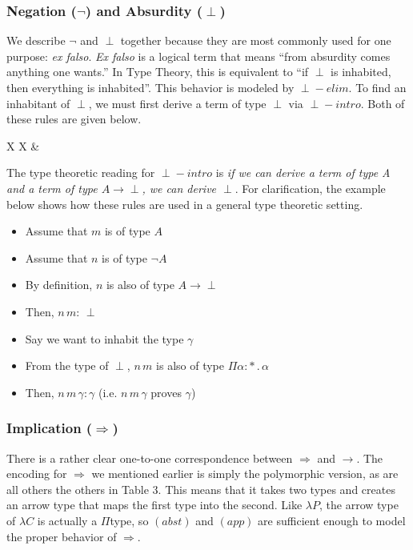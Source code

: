 \documentclass[9pt,preprint,nocopyrightspace,computermodern]{sigplanconf} %
\begin{document}
\subsubsection* {Negation (\(\neg\)) and Absurdity (\(\perp\))}
We describe \(\neg\) and \(\perp\) together because they are most commonly used
for one purpose: \textit{ex falso}. \textit{Ex falso} is a logical term that means
``from absurdity comes anything one wants.'' In Type Theory, this is equivalent to
``if \(\perp\) is inhabited, then everything is inhabited''. This behavior is modeled
by \(\perp\!\!-elim\). To find an inhabitant of \(\perp\), we must first derive a term
of type \(\perp\) via \(\perp\!\!-intro\). Both of these rules are given below.
\begin{center}
  \begin{tabu}{ X[c]  X[c] }
     &
      \\
  \end{tabu}
\end{center}
The type theoretic reading for \(\perp\!\! -intro\) is
\textit{if we can derive a term of type A and a term of type \(A\rightarrow\perp\), we can derive \(\perp\)}.
For clarification, the example below shows how these rules are used in a general
type theoretic setting.
\begin{itemize}
\item Assume that \(m\) is of type \(A\)
\item Assume that \(n\) is of type \(\neg A\)
\item By definition, \(n\) is also of type \(A\rightarrow\perp\)
\item Then, \(n\,m : \,\perp\)
\item Say we want to inhabit the type \(\gamma\)
\item From the type of \(\perp\), \(n\,m\) is also of type \(\Pi\alpha:*\,.\,\alpha\)
\item Then, \(n\,m\,\gamma : \gamma\) (i.e. \(n\,m\,\gamma\) proves \(\gamma\))
\end{itemize}

\subsubsection* {Implication (\(\Rightarrow\))}
There is a rather clear one-to-one correspondence between \(\Rightarrow\) and \(\rightarrow\).
The encoding for \(\Rightarrow\) we mentioned earlier is simply the polymorphic version,
as are all others the others in Table 3. This means that it takes two types and
creates an arrow type that maps the first type into the second. Like \(\lambda P\),
the arrow type of \(\lambda C\) is actually a \(\Pi\)type, so \((abst)\) and \((app)\)
are sufficient enough to model the proper behavior of \(\Rightarrow\).
\end{document}
